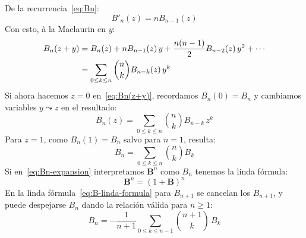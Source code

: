   De la recurrencia~\eqref{eq:Bn}:
  \begin{equation*}
    B'_n(z)
     = n B_{n - 1}(z)
  \end{equation*}
  Con esto,
  à la Maclaurin en \(y\):
  \begin{align}
    B_n(z + y)
      &= B_n(z)
	  + n B_{n - 1}(z) \, y
	  + \frac{n (n - 1)}{2} B_{n - 2}(z) \, y^2
	  + \dotsb \notag \\
      &= \sum_{0 \le k \le n} \binom{n}{k} B_{n - k}(z) \, y^k
	    \label{eq:Bn(z+y)}
  \end{align}
  Si ahora hacemos \(z = 0\) en~\eqref{eq:Bn(z+y)},
  recordamos \(B_n(0) = B_n\)
  y cambiamos variables \(y \leadsto z\) en el resultado:
  \begin{equation}
    \label{eq:Bn(z)-expansion}
    B_n(z)
      = \sum_{0 \le k \le n} \binom{n}{k} B_{n - k} \, z^k
  \end{equation}
  Para \(z = 1\),
  como \(B_n(1) = B_n\)
  salvo para \(n = 1\),
  resulta:
  \begin{equation}
    \label{eq:Bn-expansion}
    B_n
      = \sum_{0 \le k \le n} \binom{n}{k} B_k
  \end{equation}
  Si en~\eqref{eq:Bn-expansion}
  interpretamos \(\mathbf{B}^n\) como \(B_n\)
  tenemos la linda fórmula:%
  \begin{equation}
    \label{eq:B-linda-formula}
    \mathbf{B}^n
      = (1 + \mathbf{B})^n
  \end{equation}
  En la linda fórmula~\eqref{eq:B-linda-formula}
  para \(B_{n + 1}\) se cancelan los \(B_{n + 1}\),
  y puede despejarse \(B_n\)
  dando la relación válida para \(n \ge 1\):
  \begin{equation*}
    B_n
      = - \frac{1}{n + 1}
	    \sum_{0 \le k \le n - 1} \binom{n + 1}{k} \, B_k
  \end{equation*}

